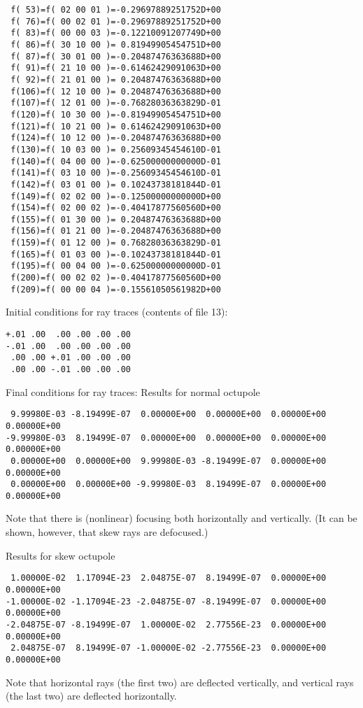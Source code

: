 \begin{footnotesize}
\begin{verbatim}
 f( 53)=f( 02 00 01 )=-0.29697889251752D+00
 f( 76)=f( 00 02 01 )=-0.29697889251752D+00
 f( 83)=f( 00 00 03 )=-0.12210091207749D+00
 f( 86)=f( 30 10 00 )= 0.81949905454751D+00
 f( 87)=f( 30 01 00 )=-0.20487476363688D+00
 f( 91)=f( 21 10 00 )=-0.61462429091063D+00
 f( 92)=f( 21 01 00 )= 0.20487476363688D+00
 f(106)=f( 12 10 00 )= 0.20487476363688D+00
 f(107)=f( 12 01 00 )=-0.76828036363829D-01
 f(120)=f( 10 30 00 )=-0.81949905454751D+00
 f(121)=f( 10 21 00 )= 0.61462429091063D+00
 f(124)=f( 10 12 00 )=-0.20487476363688D+00
 f(130)=f( 10 03 00 )= 0.25609345454610D-01
 f(140)=f( 04 00 00 )=-0.62500000000000D-01
 f(141)=f( 03 10 00 )=-0.25609345454610D-01
 f(142)=f( 03 01 00 )= 0.10243738181844D-01
 f(149)=f( 02 02 00 )=-0.12500000000000D+00
 f(154)=f( 02 00 02 )=-0.40417877560560D+00
 f(155)=f( 01 30 00 )= 0.20487476363688D+00
 f(156)=f( 01 21 00 )=-0.20487476363688D+00
 f(159)=f( 01 12 00 )= 0.76828036363829D-01
 f(165)=f( 01 03 00 )=-0.10243738181844D-01
 f(195)=f( 00 04 00 )=-0.62500000000000D-01
 f(200)=f( 00 02 02 )=-0.40417877560560D+00
 f(209)=f( 00 00 04 )=-0.15561050561982D+00
\end{verbatim}
\end{footnotesize}
Initial conditions for ray traces (contents of file 13):
\begin{footnotesize}
\begin{verbatim}
+.01 .00  .00 .00 .00 .00
-.01 .00  .00 .00 .00 .00
 .00 .00 +.01 .00 .00 .00
 .00 .00 -.01 .00 .00 .00
\end{verbatim}
\end{footnotesize}
Final conditions for ray traces:
\vspace{5mm}
\noindent Results for normal octupole
\begin{footnotesize}
\begin{verbatim}
 9.99980E-03 -8.19499E-07  0.00000E+00  0.00000E+00  0.00000E+00  0.00000E+00
-9.99980E-03  8.19499E-07  0.00000E+00  0.00000E+00  0.00000E+00  0.00000E+00
 0.00000E+00  0.00000E+00  9.99980E-03 -8.19499E-07  0.00000E+00  0.00000E+00
 0.00000E+00  0.00000E+00 -9.99980E-03  8.19499E-07  0.00000E+00  0.00000E+00
\end{verbatim}
\end{footnotesize}
Note that there is (nonlinear) focusing both horizontally and vertically.
(It can be shown, however, that skew rays are defocused.)
\vspace{5mm}

\noindent Results for skew octupole
\begin{footnotesize}
\begin{verbatim}
 1.00000E-02  1.17094E-23  2.04875E-07  8.19499E-07  0.00000E+00  0.00000E+00
-1.00000E-02 -1.17094E-23 -2.04875E-07 -8.19499E-07  0.00000E+00  0.00000E+00
-2.04875E-07 -8.19499E-07  1.00000E-02  2.77556E-23  0.00000E+00  0.00000E+00
 2.04875E-07  8.19499E-07 -1.00000E-02 -2.77556E-23  0.00000E+00  0.00000E+00
\end{verbatim}
\end{footnotesize}
Note that horizontal rays (the first two) are deflected vertically,
and vertical rays (the last two) are deflected horizontally.


